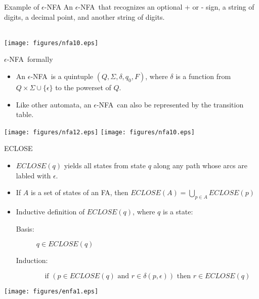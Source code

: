 \documentclass{prosper}%
\newcommand{\egk}{\mbox{$\epsilon$}}
\newcommand{\enfa}{{$\epsilon$-NFA}}
\begin{document}
\begin{slide}{Example of \enfa}
An \enfa\ that recognizes an optional + or - sign, a string of digits, a decimal point, and another string of digits.\\\ \\
\begin{center}
\texttt{[image: figures/nfa10.eps]}
\end{center}
\end{slide}


\begin{slide}{\enfa\ formally}
\begin{itemize}
\item An \enfa\ is a quintuple $(Q, \Sigma, \delta, q_0, F)$, where $\delta$ is a function from $Q\times\Sigma\cup\{\epsilon\}$ to the powerset of $Q$.
\item Like other automata, an \enfa\ can also be represented by the transition table.
\end{itemize}
\begin{center}
\texttt{[image: figures/nfa12.eps]}
\texttt{[image: figures/nfa10.eps]}
\end{center}
\end{slide}

\begin{slide}{ECLOSE}
\begin{itemize}
\item $ECLOSE(q)$  yields all states  from state $q$ along any path whose arcs are labled with  \egk.
\item If $A$ is a set of states of an FA, then 
\(
ECLOSE(A)=\bigcup_{p\in A}ECLOSE(p)
\)
\item Inductive definition of $ECLOSE(q)$, where $q$ is a state:
\begin{description}
\item[Basis:] $q \in ECLOSE(q)$
\item[Induction:] \[\mbox{if }(p\in ECLOSE(q) \mbox{ and } r \in \delta(p,\epsilon)) \mbox{ then }
r\in ECLOSE(q)\]
\end{description}
\end{itemize}
\begin{center}
\texttt{[image: figures/enfa1.eps]}
\end{center}

\end{slide}
\end{document}
